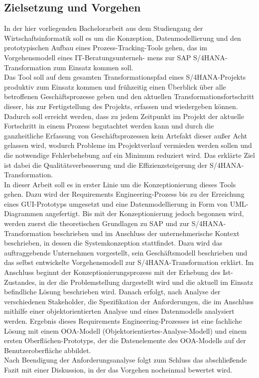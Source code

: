 \subsection{Zielsetzung und Vorgehen}
In der hier vorliegenden Bachelorarbeit aus dem Studiengang der Wirtschaftsinformatik soll es um die Konzeption, Datenmodellierung und den prototypischen Aufbau eines Prozess-Tracking-Tools gehen, das im Vorgehensmodell eines IT-Beratungsunterneh- mens zur SAP S/4HANA-Transformation zum Einsatz kommen soll.\\ Das Tool soll auf dem gesamten Transformationspfad eines S/4HANA-Projekts produktiv zum Einsatz kommen und frühzeitig einen Überblick über alle betroffenen Geschäftsprozesse geben und den aktuellen Transformationsfortschritt dieser, bis zur Fertigstellung des Projekts, erfassen und wiedergeben können. Dadurch soll erreicht werden, dass zu jedem Zeitpunkt im Projekt der aktuelle Fortschritt in einem Prozess begutachtet werden kann und durch die ganzheitliche Erfassung von Geschäftsprozessen kein Artefakt dieser außer Acht gelassen wird, wodurch Probleme im Projektverlauf vermieden werden sollen und die notwendige Fehlerbehebung auf ein Minimum reduziert wird. Das erklärte Ziel ist dabei die Qualitätsverbesserung und die Effizienzsteigerung der S/4HANA-Transformation.\\
In dieser Arbeit soll es in erster Linie um die Konzeptionierung dieses Tools gehen. Dazu wird der Requirements Engineering-Prozess bis zu der Erreichung eines GUI-Prototyps umgesetzt und eine Datenmodellierung in Form von UML-Diagrammen angefertigt. Bis mit der Konzeptionierung jedoch begonnen wird, werden zuerst die theoretischen Grundlagen zu SAP und zur S/4HANA-Transformation beschrieben und im Anschluss der unternehmerische Kontext beschrieben, in dessen die Systemkonzeption stattfindet. Dazu wird das auftraggebende Unternehmen vorgestellt, sein Geschäftsmodell beschrieben und das selbst entwickelte Vorgehensmodell zur S/4HANA-Transformation erklärt. Im Anschluss beginnt der Konzeptionierungsprozess mit der Erhebung des Ist-Zustandes, in der die Problemstellung dargestellt wird und die aktuell im Einsatz befindliche Lösung beschrieben wird. Danach erfolgt, nach Analyse der verschiedenen Stakeholder, die Spezifikation der Anforderungen, die im Anschluss mithilfe einer objektorientierten Analyse und eines Datenmodells analysiert werden. Ergebnis dieses Requirements Engineering-Prozesses ist eine fachliche Lösung mit einem OOA-Modell (Objektorientiertes-Analyse-Modell) und einem ersten Oberflächen-Prototyps, der die Datenelemente des OOA-Modells auf der Benutzeroberfläche abbildet.\\Nach Beendigung der Anforderungsanalyse folgt zum Schluss das abschließende Fazit mit einer Diskussion, in der das Vorgehen nocheinmal bewertet wird. 

